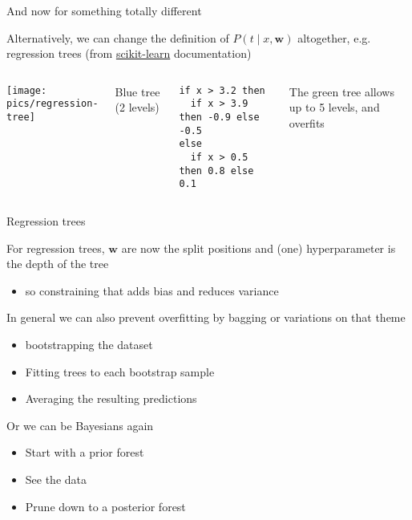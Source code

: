\documentclass{hertieteaching}
\begin{document}
\begin{frame}[fragile]{And now for something totally different}

Alternatively, we can change the definition of $P(t \mid x, \textbf{w})$ altogether, e.g. regression trees (from \href{https://scikit-learn.org/stable/auto_examples/tree/plot_iris_dtc.html}{scikit-learn} documentation)

\begin{columns}[T,onlytextwidth]

\centerline{\texttt{[image: pics/regression-tree]}}


\bigskip
\medskip
Blue tree (2 levels)
\begin{verbatim}
if x > 3.2 then 
  if x > 3.9 then -0.9 else -0.5
else
  if x > 0.5 then 0.8 else 0.1
\end{verbatim}

\medskip
The green tree allows up to 5 levels, and overfits

\end{columns}
\end{frame}

\begin{frame}[fragile]{Regression trees}

For regression trees, $\mathbf{w}$ are now the split positions and (one) hyperparameter is the depth of the tree
\begin{itemize}
  \item so constraining that adds bias and reduces variance
\end{itemize}
In general we can also prevent overfitting by bagging \parencite{Breiman1996} or variations on that theme \parencite[e.g. Random forests][]{Cutler.etal2012}
\begin{itemize}
  \item bootstrapping the dataset
  \item Fitting trees to each bootstrap sample
  \item Averaging the resulting predictions
\end{itemize}

\pause 

Or we can be Bayesians again \parencite[e.g.][BART]{Chipman.etal2010a}
\begin{itemize}
  \item Start with a prior forest
  \item See the data 
  \item Prune down to a posterior forest
\end{itemize}

\end{frame}
\end{document}
